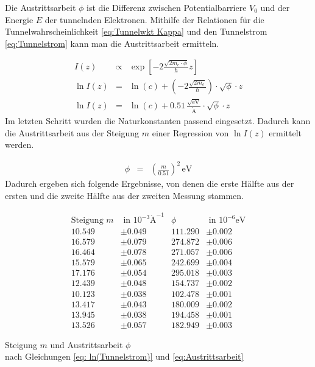 \documentclass[12pt,a4paper]{scrartcl}
\numberwithin{equation}{section} %
\begin{document}
Die Austrittsarbeit $\phi$ ist die Differenz zwischen Potentialbarriere $V_0$ und der Energie $E$ der tunnelnden Elektronen. Mithilfe der Relationen für die Tunnelwahrscheinlichkeit \eqref{eq:Tunnelwkt Kappa} und den Tunnelstrom \eqref{eq:Tunnelstrom} kann man die Austrittsarbeit ermitteln.

\begin{eqnarray}
    I(z) &\propto& \exp\left[-2\frac{\sqrt{2m_e\cdot \phi}}{\hbar} z\right] \\
    \ln I(z)
        &=& \ln(c)
            + \left(-2\frac{\sqrt{2m_e}}{\hbar}\right)
            \cdot \sqrt{\phi} \cdot z \\
    \ln I(z) &=& \ln(c) + 0.51 \mathrm{\,\frac{\sqrt{eV}}{\mathrm{\mathring{A}}}}\cdot \sqrt{\phi} \cdot z \label{eq: ln(Tunnelstrom)}
\end{eqnarray}
Im letzten Schritt wurden die Naturkonstanten passend eingesetzt.
\cite{Anleitung} Dadurch kann die Austrittsarbeit aus der Steigung $m$ einer
Regression von $\ln I(z)$ ermittelt werden.

\begin{eqnarray}
    \phi &=& \left(\frac{m}{0.51}\right)^2 \mathrm{\,eV} \label{eq:Austrittsarbeit}
\end{eqnarray}
Dadurch ergeben sich folgende Ergebnisse, von denen die erste Hälfte aus der ersten und die zweite Hälfte aus der zweiten Messung stammen.

	\begin{table}[h!]
	\centering
	\begin{align*}
		\text{Steigung } m &\text{ in } 10^{-3}\mathrm{\mathring A}^{-1}
		& \phi &\text{ in } 10^{-6}\mathrm{eV} \\
		10.549 &\pm 0.049 & 111.290 &\pm 0.002 \\
		16.579 &\pm 0.079 & 274.872 &\pm 0.006 \\
		16.464 &\pm 0.078 & 271.057 &\pm 0.006 \\
		15.579 &\pm 0.065 & 242.699 &\pm 0.004 \\
		17.176 &\pm 0.054 & 295.018 &\pm 0.003 \\
		12.439 &\pm 0.048 & 154.737 &\pm 0.002 \\
		10.123 &\pm 0.038 & 102.478 &\pm 0.001 \\
		13.417 &\pm 0.043 & 180.009 &\pm 0.002 \\
		13.945 &\pm 0.038 & 194.458 &\pm 0.001 \\
		13.526 &\pm 0.057 & 182.949 &\pm 0.003
	\end{align*}
	\caption{Steigung $m$ und Austrittsarbeit $\phi$\\
		nach Gleichungen \eqref{eq: ln(Tunnelstrom)} und \eqref{eq:Austrittsarbeit}}
	\label{table:Austrittsarbeit}
\end{table}
\end{document}
